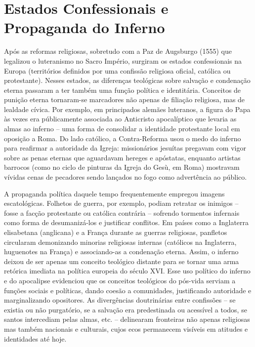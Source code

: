 \section{Estados Confessionais e Propaganda do Inferno}

Após as reformas religiosas, sobretudo com a Paz de Augsburgo (1555) que legalizou o luteranismo no Sacro Império, surgiram os estados confessionais na Europa (territórios definidos por uma confissão religiosa oficial, católica ou protestante). Nesses estados, as diferenças teológicas sobre salvação e condenação eterna passaram a ter também uma função política e identitária. Conceitos de punição eterna tornaram-se marcadores não apenas de filiação religiosa, mas de lealdade cívica. Por exemplo, em principados alemães luteranos, a figura do Papa às vezes era públicamente associada ao Anticristo apocalíptico que levaria as almas ao inferno -- uma forma de consolidar a identidade protestante local em oposição a Roma. Do lado católico, a Contra-Reforma usou o medo do inferno para reafirmar a autoridade da Igreja: missionários jesuítas pregavam com vigor sobre as penas eternas que aguardavam hereges e apóstatas, enquanto artistas barrocos (como no ciclo de pinturas da Igreja do Gesù, em Roma) mostravam vívidas cenas de pecadores sendo lançados no fogo como advertência ao público.

A propaganda política daquele tempo frequentemente empregou imagens escatológicas. Folhetos de guerra, por exemplo, podiam retratar os inimigos -- fosse a facção protestante ou católica contrária -- sofrendo tormentos infernais como forma de desumanizá-los e justificar conflitos. Em países como a Inglaterra elisabetana (anglicana) e a França durante as guerras religiosas, panfletos circularam demonizando minorias religiosas internas (católicos na Inglaterra, huguenotes na França) e associando-as a condenação eterna. Assim, o inferno deixou de ser apenas um conceito teológico distante para se tornar uma arma retórica imediata na política europeia do século XVI. Esse uso político do inferno e do apocalipse evidenciou que os conceitos teológicos do pós-vida serviam a funções sociais e políticas, dando coesão a comunidades, justificando autoridade e marginalizando opositores. As divergências doutrinárias entre confissões -- se existia ou não purgatório, se a salvação era predestinada ou acessível a todos, se santos intercediam pelas almas, etc. -- delinearam fronteiras não apenas religiosas mas também nacionais e culturais, cujos ecos permanecem visíveis em atitudes e identidades até hoje.

